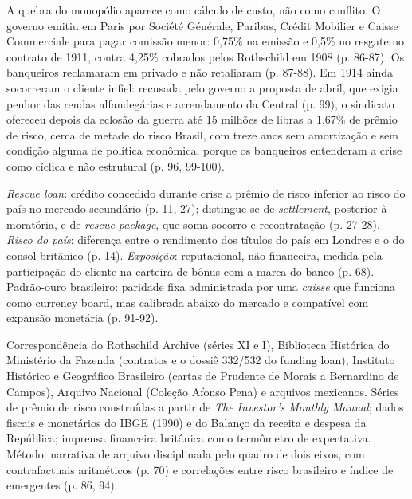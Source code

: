 A quebra do monopólio aparece como cálculo de custo, não como conflito. O governo
emitiu em Paris por Société Générale, Paribas, Crédit Mobilier e Caisse
Commerciale para pagar comissão menor: 0,75\% na emissão e 0,5\% no resgate no
contrato de 1911, contra 4,25\% cobrados pelos Rothschild em 1908 (p. 86-87). Os
banqueiros reclamaram em privado e não retaliaram (p. 87-88). Em 1914 ainda
socorreram o cliente infiel: recusada pelo governo a proposta de abril, que
exigia penhor das rendas alfandegárias e arrendamento da Central (p. 99), o
sindicato ofereceu depois da eclosão da guerra até 15 milhões de libras a 1,67\%
de prêmio de risco, cerca de metade do risco Brasil, com treze anos sem
amortização e sem condição alguma de política econômica, porque os banqueiros
entenderam a crise como cíclica e não estrutural (p. 96, 99-100).




\textit{Rescue loan}: crédito concedido durante crise a prêmio de risco inferior
ao risco do país no mercado secundário (p. 11, 27); distingue-se de
\textit{settlement}, posterior à moratória, e de \textit{rescue package}, que soma
socorro e recontratação (p. 27-28). \textit{Risco do país}: diferença entre o
rendimento dos títulos do país em Londres e o do consol britânico (p. 14).
\textit{Exposição}: reputacional, não financeira, medida pela participação do
cliente na carteira de bônus com a marca do banco (p. 68). Padrão-ouro
brasileiro: paridade fixa administrada por uma \textit{caisse} que funciona como
currency board, mas calibrada abaixo do mercado e compatível com expansão
monetária (p. 91-92).


Correspondência do Rothschild Archive (séries XI e I), Biblioteca Histórica do
Ministério da Fazenda (contratos e o dossiê 332/532 do funding loan), Instituto
Histórico e Geográfico Brasileiro (cartas de Prudente de Morais a Bernardino de
Campos), Arquivo Nacional (Coleção Afonso Pena) e arquivos mexicanos. Séries de
prêmio de risco construídas a partir de \textit{The Investor's Monthly Manual};
dados fiscais e monetários do IBGE (1990) e do Balanço da receita e despesa da
República; imprensa financeira britânica como termômetro de expectativa. Método:
narrativa de arquivo disciplinada pelo quadro de dois eixos, com contrafactuais
aritméticos (p. 70) e correlações entre risco brasileiro e índice de emergentes
(p. 86, 94).

